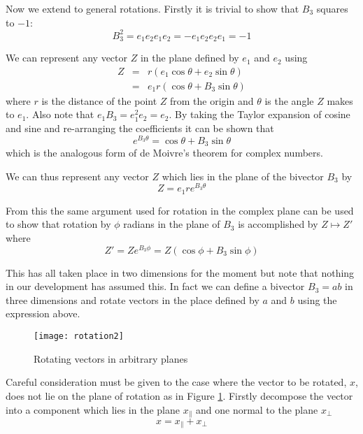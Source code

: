 Now we extend to general rotations. Firstly it is trivial to
show that $B_3$ squares to $-1$:
\begin{displaymath}
B_3^2 = e_1e_2e_1e_2 = -e_1e_2e_2e_1 = -1
\end{displaymath}

We can represent any vector $Z$ in the plane defined by $e_1$ and
$e_2$ using
\begin{eqnarray*}
Z & = & r ( e_1 \cos \theta + e_2 \sin \theta) \\
  & = & e_1 r ( \cos \theta + B_3 \sin \theta)
\end{eqnarray*}
where $r$ is the distance of the point $Z$ from the origin
and $\theta$ is the angle $Z$ makes to $e_1$. Also note
that $e_1B_3 = e_1^2e_2 = e_2$. By taking the Taylor expansion of cosine
and sine and re-arranging the coefficients it can be shown that
\[
e^{B_3\theta} = \cos \theta + B_3 \sin \theta
\]
which is the analogous form of de Moivre's theorem for complex
numbers.

We can thus represent any vector $Z$ which lies in the plane of the
bivector $B_3$ by
\[
Z=e_1re^{B_3\theta}
\]

From this the same argument used for rotation in the complex plane 
can be used to show that rotation by
$\phi$ radians in the plane of $B_3$ is accomplished by $Z \mapsto Z'$
where
\begin{displaymath}
Z' = Ze^{B_3\phi} = Z (\cos \phi + B_3 \sin \phi)
\end{displaymath}

This has all taken place in two dimensions for the moment but note that nothing
in our development has assumed this. In fact we can define a bivector $B_3 = ab$ in
three dimensions and rotate vectors in the place defined by $a$ and $b$ using
the expression above.

\begin{figure}
\centering
\texttt{[image: rotation2]}
\caption{Rotating vectors in arbitrary planes\label{fig:rotation2}}
\end{figure}

Careful consideration must be given to the case where the vector to be
rotated, $x$, does not lie on the plane of rotation as in Figure
\ref{fig:rotation2}. Firstly decompose the
vector into a component which lies in the plane $x_\parallel$ and one
normal to the plane $x_\perp$
\[
x = x_\parallel + x_\perp
\]

